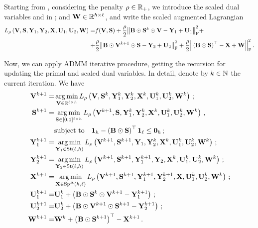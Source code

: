 Starting from , considering the penalty $\rho \in \mathbb{R}_+$, we introduce the scaled dual variables \scaledUO and \scaledUT in \rmatdim; and $\mathbf{W} \in \mathbb{R}^{h \times \ell}$, and write the scaled augmented Lagrangian
\begin{equation}\label{eq:scaledAUL_partial}
    \begin{aligned}
    L_\rho\left(\mathbf{V},\mathbf{S},\mathbf{Y}_1,\mathbf{Y}_2,\mathbf{X},\mathbf{U}_1,\mathbf{U}_2,\mathbf{W}\right) =& f(\mathbf{V},\mathbf{S}) + \frac{\rho}{2}\norm{\mathbf{B}\odot\mathbf{S}^k\odot\mathbf{V} - \mathbf{Y}_1 +\mathbf{U}_1}_{\mathrm{F}}^2 + \\
    +& \frac{\rho}{2}\norm{\mathbf{B}\odot\mathbf{V}^{k+1}\odot\mathbf{S} - \mathbf{Y}_2 +\mathbf{U}_2}_{\mathrm{F}}^2 + \frac{\rho}{2}\norm{\left(\mathbf{B} \odot \mathbf{S}\right)^\top - \mathbf{X} + \mathbf{W}}_{\mathrm{F}}^2\,.        
    \end{aligned}
\end{equation}

Now, we can apply ADMM iterative procedure, getting the recursion for updating the primal and scaled dual variables. 
In detail, denote by $k \in \mathbb{N}$ the current iteration.
We have
\begin{equation}\label{eq:ADMM_partial}
    \begin{aligned}        
        \mathbf{V}^{k+1}=&\operatorname*{arg\,min}_{\mathbf{V} \in \mathbb{R}^{\ell \times h}} L_\rho\left(\mathbf{V},\mathbf{S}^k,\mathbf{Y}_1^k,\mathbf{Y}_2^k,\mathbf{X}^k,\mathbf{U}_1^k,\mathbf{U}_2^k,\mathbf{W}^k\right)\,;\\
        \mathbf{S}^{k+1}=&\operatorname*{arg\,min}_{\mathbf{S} \in [0,1]^{\ell \times h}} L_\rho\left(\mathbf{V}^{k+1},\mathbf{S},\mathbf{Y}_1^k,\mathbf{Y}_2^k,\mathbf{X}^k,\mathbf{U}_1^k,\mathbf{U}_2^k,\mathbf{W}^k\right)\,,\\
        & \textrm{subject to} \quad \boldsymbol{1}_h - \left(\mathbf{B} \odot \mathbf{S}\right)^\top \boldsymbol{1}_\ell \leq \boldsymbol{0}_h\,; \\
        \mathbf{Y}_1^{k+1}=&\operatorname*{arg\,min}_{\mathbf{Y}_1 \in \mathrm{St}({\ell},{h})} L_\rho\left(\mathbf{V}^{k+1},\mathbf{S}^{k+1},\mathbf{Y}_1,\mathbf{Y}_2^k,\mathbf{X}^k,\mathbf{U}_1^k,\mathbf{U}_2^k,\mathbf{W}^k\right)\,;\\
        \mathbf{Y}_2^{k+1}=&\operatorname*{arg\,min}_{\mathbf{Y}_2 \in \mathrm{St}({\ell},{h})} L_\rho\left(\mathbf{V}^{k+1},\mathbf{S}^{k+1},\mathbf{Y}_1^{k+1},\mathbf{Y}_2,\mathbf{X}^k,\mathbf{U}_1^k,\mathbf{U}_2^k,\mathbf{W}^k\right)\,;\\
        \mathbf{X}^{k+1}=&\operatorname*{arg\,min}_{\mathbf{X} \in \mathrm{Sp}^{\Delta}({h},{\ell})} L_\rho\left(\mathbf{V}^{k+1},\mathbf{S}^{k+1},\mathbf{Y}_1^{k+1},\mathbf{Y}_2^{k+1},\mathbf{X},\mathbf{U}_1^k,\mathbf{U}_2^k,\mathbf{W}^k\right)\,;\\
        \mathbf{U}_1^{k+1}=&\mathbf{U}_1^k + \left(\mathbf{B}\odot\mathbf{S}^{k}\odot\mathbf{V}^{k+1} - \mathbf{Y}_1^{k+1}\right)\,;\\
        \mathbf{U}_2^{k+1}=&\mathbf{U}_2^k + \left(\mathbf{B}\odot\mathbf{V}^{k+1}\odot\mathbf{S}^{k+1} - \mathbf{Y}_2^{k+1}\right)\,;\\
        \mathbf{W}^{k+1}=&\mathbf{W}^k + \left(\mathbf{B} \odot \mathbf{S}^{k+1}\right)^\top - \mathbf{X}^{k+1}\,.
    \end{aligned}
\end{equation}

